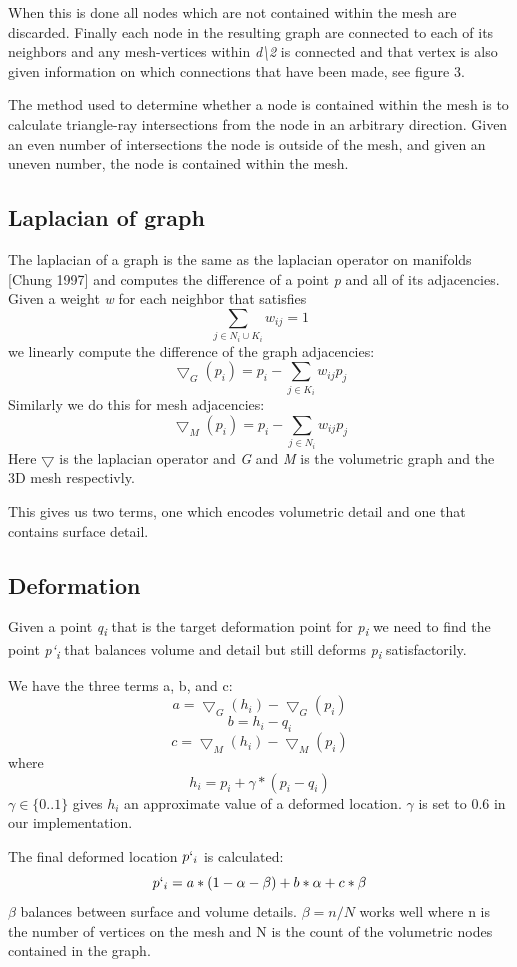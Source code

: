 \documentclass[10pt]{article}
\begin{document}
\begin{multicols}{2}
When this is done all nodes which are not contained within the mesh are discarded. Finally each node in the resulting graph are connected to each of its neighbors and any mesh-vertices within \textit{d\textbackslash2} is connected and that vertex is also given information on which connections that have been made, see figure 3.

The method used to determine whether a node is contained within the mesh is to calculate triangle-ray intersections from the node in an arbitrary direction. Given an even number of intersections the node is outside of the mesh, and given an uneven number, the node is contained within the mesh.

\subsection{Laplacian of graph}
The laplacian of a graph is the same as the laplacian operator on manifolds [Chung 1997] and computes the difference of a point \textit{p} and all of its adjacencies. Given a weight \textit{w} for each neighbor that satisfies \[ \sum_{j\in N_i \cup K_i} w_{ij} = 1\] we linearly compute the difference of the graph adjacencies: \[ \bigtriangledown_G(p_i) = p_i - \sum_{j\in K_i}w_{ij}p_j \] Similarly we do this for mesh adjacencies: \[ \bigtriangledown_M(p_i) = p_i - \sum_{j\in N_i}w_{ij}p_j \] Here $\bigtriangledown$ is the laplacian operator and \textit{G} and \textit{M} is the volumetric graph and the 3D mesh respectivly.

This gives us two terms, one which encodes volumetric detail and one that contains surface detail.
\subsection{Deformation}
Given a point \textit{q\textsubscript{i}} that is the target deformation point for \textit{p\textsubscript{i}} we need to find the point \textit{p`\textsubscript{i}} that balances volume and detail but still deforms \textit{p\textsubscript{i}} satisfactorily. 

We have the three terms a, b, and c: 
\[ a = \bigtriangledown_G(h_{i}) - \bigtriangledown_G(p_i)\]
\[ b = h_i - q_i\]
\[ c = \bigtriangledown_M(h_{i}) - \bigtriangledown_M(p_i)\]
where \[ h_i = p_i + \gamma*(p_i - q_i)\]
$\gamma \in \{ 0..1 \}$ gives $h_i$ an approximate value of a deformed location. $\gamma$ is set to 0.6 in our implementation.

The final deformed location $p`_i$ is calculated:
\[ p`_i = a*(1 - \alpha - \beta) + b*\alpha + c*\beta \]
$\beta$ balances between surface and volume details. $\beta = n/N$ works well where n is the number of vertices on the mesh and N is the count of the volumetric nodes contained in the graph. 


\end{multicols}
\end{document}
